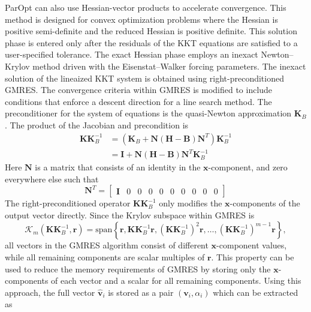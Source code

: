 \documentclass[12pt]{article}
\newcommand{\mb}{\mathbf}
\begin{document}
ParOpt can also use Hessian-vector products to accelerate convergence.
This method is designed for convex optimization problems where the Hessian is positive semi-definite and the reduced Hessian is positive definite.
This solution phase is entered only after the residuals of the KKT equations are satisfied to a user-specified tolerance.
The exact Hessian phase employs an inexact Newton--Krylov method driven with the Eisenstat--Walker forcing parameters.
The inexact solution of the lineaized KKT system is obtained using right-preconditioned GMRES.
The convergence criteria within GMRES is modified to include conditions that enforce a descent direction for a line search method.
The preconditioner for the system of equations is the quasi-Newton approximation $\mb{K}_{B}$.
The product of the Jacobian and precondition is
%
\begin{equation}
  \begin{aligned}
    \mb{K}\mb{K}_{B}^{-1} & = \left(\mb{K}_{B} +
    \mb{N}\left(\mb{H} - \mb{B}\right)\mb{N}^{T}\right)\mb{K}_{B}^{-1} \\
    & = \mb{I} + \mb{N} \left(\mb{H} - \mb{B} \right) \mb{N}^{T} \mb{K}_{B}^{-1}
  \end{aligned}
\end{equation}
Here $\mb{N}$ is a matrix that consists of an identity in the $\mb{x}$-component, and zero everywhere else such that
%
\begin{equation*}
  \mb{N}^{T} = \begin{bmatrix} \mb{I} & 0 & 0 & 0 & 0 & 0 & 0 & 0 & 0 & 0 \end{bmatrix}
\end{equation*}
The right-preconditioned operator $\mb{K}\mb{K}_{B}^{-1}$ only modifies the $\mb{x}$-components of the output vector directly.
Since the Krylov subspace within GMRES is
\begin{equation*}
  \mathcal{K}_{m}(\mb{K}\mb{K}_{B}^{-1}, \mb{r}) = \text{span} \left\{\mb{r}, \mb{K}\mb{K}_{B}^{-1}\mb{r}, \left(\mb{K}\mb{K}_{B}^{-1}\right)^{2} \mb{r}, \ldots, \left(\mb{K}\mb{K}_{B}^{-1}\right)^{m-1} \mb{r} \right\},
\end{equation*}
all vectors in the GMRES algorithm consist of different $\mb{x}$-component values, while all remaining components are scalar multiples of $\mb{r}$.
This property can be used to reduce the memory requirements of GMRES by storing only the $\mb{x}$-components of each vector and a scalar for all remaining components.
Using this approach, the full vector $\hat{\mb{v}}_{i}$ is stored as a pair $(\mb{v}_{i}, \alpha_{i})$ which can be extracted as
\end{document}

